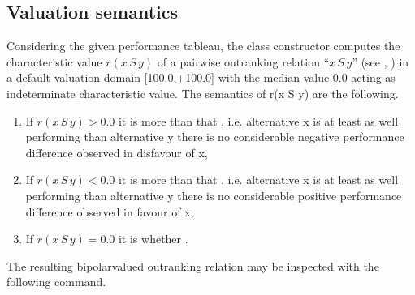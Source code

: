 \documentclass[a4paper,10pt,english]{sphinxhowto}
\begin{document}
\subsection{Valuation semantics}
\label{\detokenize{tutorial:valuation-semantics}}
Considering the given performance tableau, the  class constructor computes the characteristic value \(r(x\,S\,y)\) of a pairwise outranking relation “\(x\,S\,y\)” (see , ) in a default valuation domain {[}\sphinxhyphen{}100.0,+100.0{]} with the median value 0.0 acting as indeterminate characteristic value. The semantics of r(x S y) are the following.
\begin{enumerate}
%
\item {} 
If \(r(x\,S\,y) > 0.0\) it is more  than  that , i.e. alternative x is at least as well performing than alternative y  there is no considerable negative performance difference observed in disfavour of x,

\item {} 
If \(r(x\,S\,y) < 0.0\) it is more  than  that , i.e. alternative x is  at least as well performing than alternative y  there is no considerable positive performance difference observed in favour of x,

\item {} 
If \(r(x\,S\,y) = 0.0\) it is  whether .

\end{enumerate}

The resulting bipolar\sphinxhyphen{}valued outranking relation may be inspected with the following command.
\end{document}
